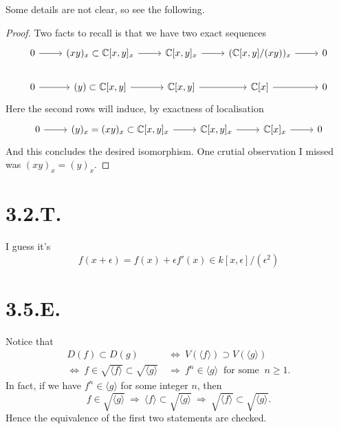 Some details are not clear, so see the following.
\begin{proof}
    Two facts to recall is that we have two exact sequences 
\[\begin{tikzcd}
	0 & {(xy)_x\subset \mathbb C[x,y]_x} & {\mathbb C[x,y]_x} & {(\mathbb C[x,y]/(xy))_x} & 0 \\
	0 & {(y)\subset \mathbb C[x,y]} & {\mathbb C[x,y]} & {\mathbb C[x]} & 0
	\arrow[from=1-1, to=1-2]
	\arrow[from=1-2, to=1-3]
	\arrow[from=1-3, to=1-4]
	\arrow[from=1-4, to=1-5]
	\arrow[from=2-1, to=2-2]
	\arrow[from=2-4, to=2-5]
	\arrow[from=2-3, to=2-4]
	\arrow[from=2-2, to=2-3]
\end{tikzcd}\]
Here the second rows will induce, by exactness of localisation 
\[\begin{tikzcd}
	0 & {(y)_x=(xy)_x\subset \mathbb C[x,y]_x} & {\mathbb C[x,y]_x} & {\mathbb C[x]_x} & 0
	\arrow[from=1-1, to=1-2]
	\arrow[from=1-4, to=1-5]
	\arrow[from=1-3, to=1-4]
	\arrow[from=1-2, to=1-3]
\end{tikzcd}\]
And this concludes the desired isomorphism. One crutial observation I missed was $(xy)_x=(y)_x$.

\end{proof}

\section{3.2.T.}

I guess it's 
\[f(x+\epsilon)=f(x)+\epsilon f'(x)\in k[x,\epsilon]/(\epsilon^2)\]

\section{3.5.E.}\label{3.5.E.}

Notice that 
\begin{align*}
	D(f) \subset D(g) &~\Leftrightarrow~ V(\langle f\rangle)\supset V(\langle g\rangle)\\
	\Leftrightarrow~ f\in \sqrt{\langle f\rangle}\subset \sqrt{\langle g\rangle} &~\Rightarrow~ f^n\in\langle g\rangle ~\text{ for some }~ n\geq 1.
\end{align*}In fact, if we have $f^n\in \langle g\rangle$ for some integer $n$, then \[f\in \sqrt{\langle g\rangle} ~\Rightarrow~ \langle f\rangle \subset \sqrt{\langle g\rangle} ~\Rightarrow~ \sqrt{\langle f\rangle}\subset\sqrt{\langle g\rangle}.\] Hence the equivalence of the first two statements are checked. 

